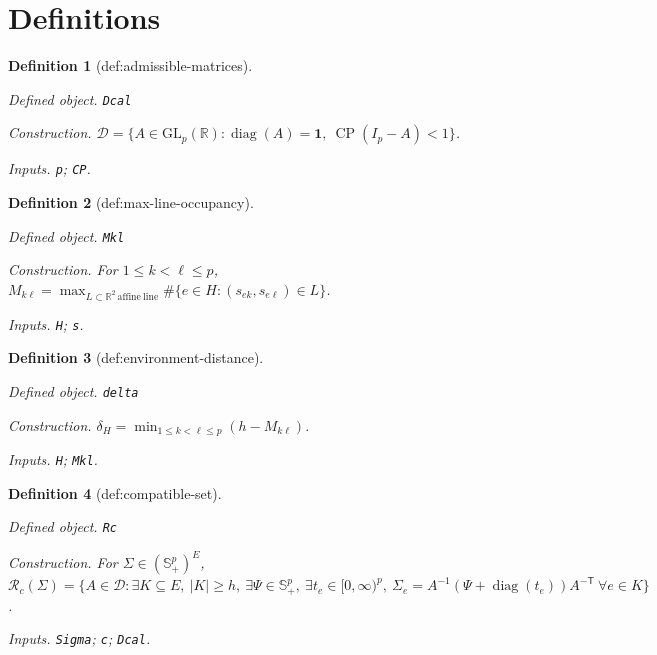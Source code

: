\documentclass{article}
\newtheorem{definition}{Definition}
\begin{document}
\section{Definitions}

\begin{definition}[def:admissible-matrices]\label{def:admissible-matrices}
\par\smallskip\noindent\emph{Defined object.} \texttt{Dcal}
\par\smallskip\noindent\emph{Construction.} \(\mathcal D=\{A\in\mathrm{GL}_p(\mathbb R):\operatorname{diag}(A)=\mathbf 1,\ \operatorname{CP}(I_p-A)<1\}\).
\par\smallskip\noindent\emph{Inputs.} \texttt{p}; \texttt{CP}.
\end{definition}

\begin{definition}[def:max-line-occupancy]\label{def:max-line-occupancy}
\par\smallskip\noindent\emph{Defined object.} \texttt{Mkl}
\par\smallskip\noindent\emph{Construction.} For \(1\le k<\ell\le p\), \(M_{k\ell}=\max_{L\subset\mathbb R^2\,\mathrm{affine\ line}}\#\{e\in H:(s_{ek},s_{e\ell})\in L\}\).
\par\smallskip\noindent\emph{Inputs.} \texttt{H}; \texttt{s}.
\end{definition}

\begin{definition}[def:environment-distance]\label{def:environment-distance}
\par\smallskip\noindent\emph{Defined object.} \texttt{delta}
\par\smallskip\noindent\emph{Construction.} \(\delta_H=\min_{1\le k<\ell\le p}(h-M_{k\ell})\).
\par\smallskip\noindent\emph{Inputs.} \texttt{H}; \texttt{Mkl}.
\end{definition}

\begin{definition}[def:compatible-set]\label{def:compatible-set}
\par\smallskip\noindent\emph{Defined object.} \texttt{Rc}
\par\smallskip\noindent\emph{Construction.} For \(\Sigma\in(\mathbb S_{+}^{p})^{E}\), \(\mathcal R_c(\Sigma)=\{A\in\mathcal D:\exists K\subseteq E,\ |K|\ge h,\ \exists\Psi\in\mathbb S_{+}^p,\ \exists t_e\in[0,\infty)^p,\ \Sigma_e=A^{-1}(\Psi+\operatorname{diag}(t_e))A^{-\mathsf T}\ \forall e\in K\}\).
\par\smallskip\noindent\emph{Inputs.} \texttt{Sigma}; \texttt{c}; \texttt{Dcal}.
\end{definition}
\end{document}

